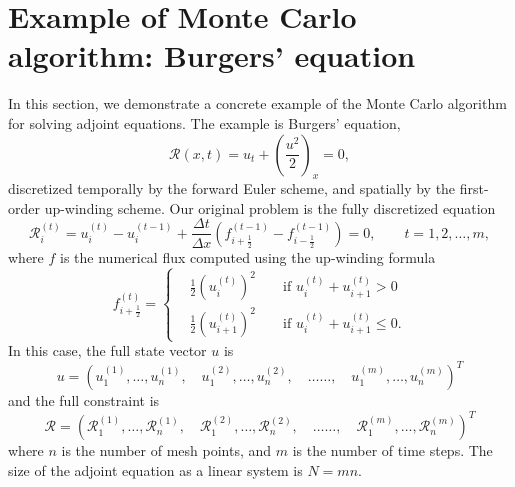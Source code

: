 \section{Example of Monte Carlo algorithm: Burgers' equation}
    In this section, we demonstrate a concrete example of the Monte Carlo
    algorithm for solving adjoint equations.  The example is Burgers' equation,
    \[ \mathcal{R}(x,t) = u_t + \left( \frac{u^2}{2} \right)_x = 0 , \]
    discretized temporally by the forward Euler scheme, and spatially by the
    first-order up-winding scheme.  Our original problem is the fully
    discretized equation
    \begin{equation} \label{expG}
        \mathcal{R}_i^{(t)} = u_i^{(t)} - u_i^{(t-1)}
        + \frac{\Delta t}{\Delta x}\left( f_{i+\frac12}^{(t-1)}
        - f_{i-\frac12}^{(t-1)} \right) = 0,
        \qquad t = 1,2,\ldots,m,
    \end{equation}
    where $f$ is the numerical flux computed using the up-winding formula
    \[ f_{i+\frac12}^{(t)} =
        \left\{ \begin{aligned}
            & \frac12 \left( u_i^{(t)} \right)^2 &&
                \mbox{ if } u_i^{(t)} + u_{i+1}^{(t)} > 0 \\
            & \frac12 \left( u_{i+1}^{(t)} \right)^2 &&
                \mbox{ if } u_i^{(t)} + u_{i+1}^{(t)} \le 0.
    \end{aligned} \right. \]
    In this case, the full state vector $u$ is
    \[ u = \left( u_1^{(1)}, \ldots, u_n^{(1)},\quad u_1^{(2)}, \ldots,
           u_n^{(2)}, \quad \ldots\ldots,\quad
           u_1^{(m)}, \ldots, u_n^{(m)} \right)^T
    \]
    and the full constraint is
    \[ \mathcal{R} = \left( \mathcal{R}_1^{(1)}, \ldots, 
                            \mathcal{R}_n^{(1)}, \quad
                            \mathcal{R}_1^{(2)}, \ldots,
                            \mathcal{R}_n^{(2)}, \quad \ldots\ldots,\quad
                            \mathcal{R}_1^{(m)}, \ldots,
                            \mathcal{R}_n^{(m)} \right)^T
    \]
    where $n$ is the number of mesh points, and $m$ is the number of
    time steps.  The size of the adjoint equation as a linear system is
    $N = m n$.
    
